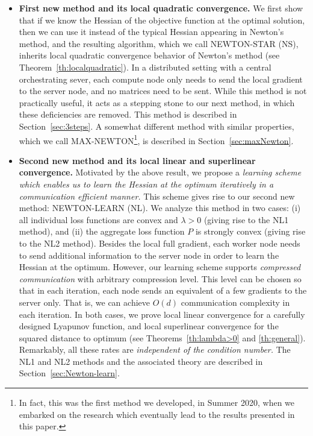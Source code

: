 \documentclass[12pt]{article}
\begin{document}
\begin{itemize}
\item {\bf First new method and its local quadratic convergence.} We first show that if we know the Hessian of the objective function at   the optimal solution, then we can use it instead of the typical Hessian appearing in Newton's method, and the resulting algorithm, which we call {\sf NEWTON-STAR (NS)}, inherits  local quadratic convergence behavior of Newton's method (see Theorem~\ref{th:localquadratic}). In a distributed setting with a central orchestrating sever, each compute node only needs to send the local  gradient  to the server  node, and no matrices need to be sent. While this method is not practically useful, it acts as a stepping stone to our next method, in which these deficiencies are removed. This method is described in Section~\ref{sec:3steps}. A somewhat different method with similar properties, which we call {\sf MAX-NEWTON}\footnote{In fact, this was the first method we developed, in Summer 2020, when we embarked on the research which eventually lead to the results presented in this paper.}, is described in Section~\ref{sec:maxNewton}. 

\item  {\bf Second new method and its local linear and superlinear convergence.} Motivated by the above result, we propose a {\em learning scheme which enables us to learn the Hessian at the optimum iteratively  in a communication efficient manner.} This scheme gives rise to our second new method: {\sf NEWTON-LEARN (NL)}. We analyze this method in two cases: (i) all individual loss functions are convex and $\lambda >0$ (giving rise to the {\sf NL1} method), and (ii) the aggregate loss function $P$ is strongly convex (giving rise to the {\sf NL2} method). Besides the local full gradient, each worker node needs to send additional information to the server node in order to learn the Hessian at the optimum. However, our learning  scheme supports {\em compressed communication} with arbitrary compression level. This level can be chosen so that in each iteration, each node sends an equivalent of a few gradients to the server only. That is, we can achieve $O(d)$ communication complexity in each iteration. In both cases, we prove local linear convergence for a carefully designed Lyapunov function, and  local superlinear convergence for the squared distance to optimum (see Theorems~\ref{th:lambda>0} and \ref{th:general}). Remarkably, all these rates are {\em independent of the condition number.} The {\sf NL1} and {\sf NL2} methods and the associated theory are described in Section~\ref{sec:Newton-learn}.


\end{itemize}
\end{document}
